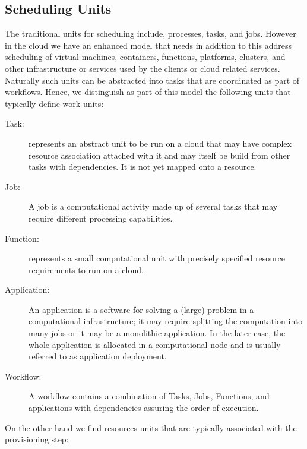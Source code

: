 \documentclass[final,5p,times,twocolumn]{elsarticle}
\begin{document}
\subsection{Scheduling Units}

\color{red}
The traditional units for scheduling include, processes, tasks, and
jobs. However in the cloud we have an enhanced model that needs in
addition to this address scheduling of virtual machines, containers,
functions, platforms, clusters, and other infrastructure or services
used by the clients or cloud related services. Naturally such units
can be abstracted into tasks that are coordinated as part of
workflows. Hence, we distinguish as part of this model the following
units that typically define work units:

\begin{description}

\item[Task:] represents an abstract unit to be run on a cloud that may
  have complex resource association attached with it and may itself be
  build from other tasks with dependencies. It is not yet mapped onto
  a resource.

\item[Job:] A job is a computational activity made up of several tasks
  that may require different processing capabilities.

\item[Function:] represents a small computational unit with precisely
  specified resource requirements to run on a cloud.

\item[Application:] An application is a software for solving a (large)
  problem in a computational infrastructure; it may require splitting
  the computation into many jobs or it may be a monolithic
  application. In the later case, the whole application is allocated
  in a computational node and is usually referred to as application
  deployment.

\item[Workflow:] A workflow contains a combination of Tasks, Jobs,
Functions, and applications with dependencies assuring the order of
execution.

\end{description}

On the other hand we find resources units that are typically
associated with the provisioning step:
\end{document}
